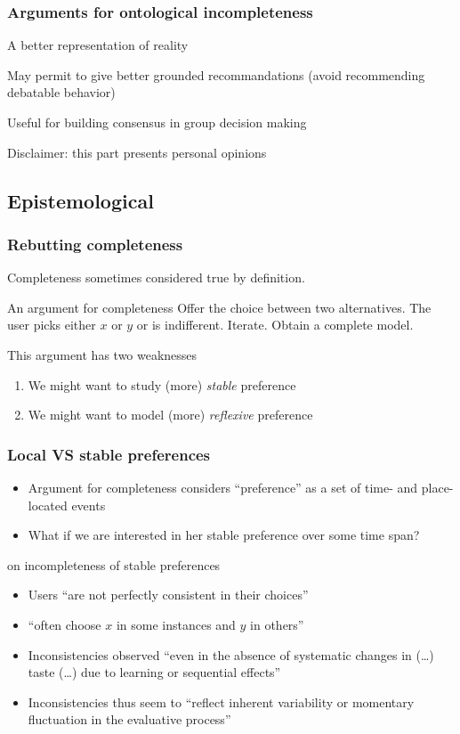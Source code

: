 \documentclass[french,english]{beamer}
\begin{document}
\begin{frame}
	\frametitle{Arguments for ontological incompleteness}
	\begin{description}[Epistemological]
		\item[Epistemological] A better representation of reality
		\item[Ethical] May permit to give better grounded recommandations (avoid recommending debatable behavior)
		\item[Practical] Useful for building consensus in group decision making
	\end{description}
	Disclaimer: this part presents personal opinions
\end{frame}

\subsection{Epistemological}
\begin{frame}
	\frametitle{Rebutting completeness}
	Completeness sometimes considered true by definition.
	\begin{block}{An argument for completeness}
		Offer the choice between two alternatives. The user picks either $x$ or $y$ or is indifferent. Iterate. Obtain a complete model.
	\end{block}
	This argument has two weaknesses
	\begin{enumerate}
		\item We might want to study (more) \emph{stable} preference
		\item We might want to model (more) \emph{reflexive} preference
	\end{enumerate}
\end{frame}

\begin{frame}
	\frametitle{Local VS stable preferences}
	\begin{itemize}
		\item Argument for completeness considers “preference” as a set of time- and place- located events
		\item What if we are interested in her stable preference over some time span?
	\end{itemize}
	\begin{block}{\citet{tversky_intransitivity_1969} on incompleteness of stable preferences}
		\begin{itemize}
			\item Users “are not perfectly consistent in their choices”
			\item “often choose $x$ in some instances and $y$ in others”
			\item Inconsistencies observed “even in the absence of systematic changes in (…) taste (…) due to learning or sequential effects”
			\item Inconsistencies thus seem to “reflect inherent variability or momentary fluctuation in the evaluative process”
		\end{itemize}
	\end{block}
\end{frame}
\end{document}
